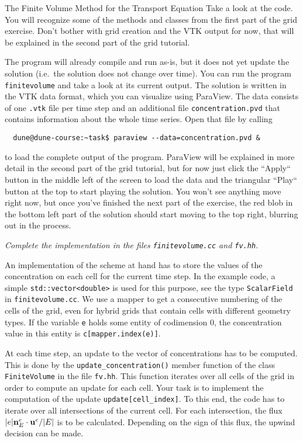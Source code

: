 \documentclass[12pt,a4paper]{article}
\newcommand{\uu}{\textbf u}
\newcommand{\nn}{\textbf n}
\begin{document}
\begin{Exercise}{The Finite Volume Method for the Transport Equation}
  Take a look at the code. You will recognize some of the methods and classes
  from the first part of the grid exercise. Don't bother with grid creation and
  the VTK output for now, that will be explained in the second part of the grid
  tutorial.

  The program will already compile and run as-is, but it does not yet update
  the solution (i.e.~the solution does not change over time). You can run the
  program \lstinline!finitevolume! and take a look at its current output. The
  solution is written in the VTK data format, which you can visualize using
  ParaView. The data consists of one \lstinline!.vtk! file per time step and
  an additional file \lstinline!concentration.pvd! that contains information
  about the whole time series. Open that file by calling
\begin{lstlisting}
  dune@dune-course:~task$ paraview --data=concentration.pvd &
\end{lstlisting}
  to load the complete output of the program. ParaView will be explained in more
  detail in the second part of the grid tutorial, but for now just click the
  ``Apply`` button in the middle left of the screen to load the data and the
  triangular ``Play`` button at the top to start playing the solution. You won't
  see anything move right now, but once you've finished the next part of the
  exercise, the red blob in the bottom left part of the solution should start
  moving to the top right, blurring out in the process.

 \emph{Complete the implementation in the files \texttt{finitevolume.cc} and \texttt{fv.hh}.}

  An implementation of the scheme at hand has to store the values of
  the concentration on each cell for the current time step.  In the
  example code, a simple \texttt{std::vector<double>} is used for this
  purpose, see the type \texttt{ScalarField} in
  \texttt{finitevolume.cc}.  We use a mapper to get a consecutive
  numbering of the cells of the grid, even for hybrid grids that contain
  cells with different geometry types.  If the variable \texttt{e}
  holds some entity of codimension 0, the concentration value in this
  entity is \texttt{c[mapper.index(e)]}.

  At each time step, an update to the vector of concentrations has to
  be computed.  This is done by the \texttt{update\_concentration()} member function
  of the class \texttt{FiniteVolume} in the file \texttt{fv.hh}.  This
  function iterates over all cells of the grid in order to compute an
  update for each cell.  Your task is to implement the computation of
  the update \texttt{update[cell\_index]}.  To this end, the code has to
  iterate over all intersections of the current cell.  For each
  intersection, the flux $|e|\nn_E^e\cdot\uu^e/|E|$ is to be
  calculated.  Depending on the sign of this flux, the upwind decision
  can be made.


\end{Exercise}
\end{document}

